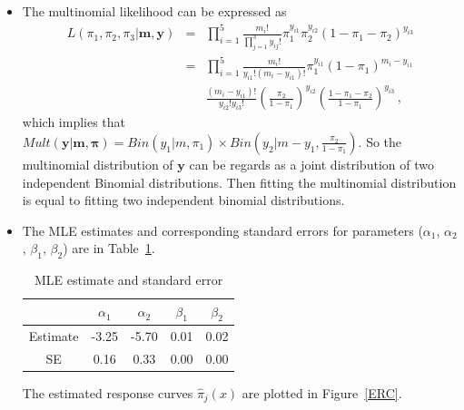 \documentclass[]{article}
\begin{document}
\begin{enumerate}
{		\item[Sol 1]
		\begin{itemize}
			\item[(a)]
			The multinomial likelihood can be expressed as 
			\begin{eqnarray}
			L(\pi_1,\pi_2,\pi_3| \bm m, \bm y)  & = &  \prod_{i = 1}^{5}\frac{m_i!}{\prod_{j = 1}^{3}y_{ij}!}\pi_1^{y_{i1}} \pi_2^{y_{i2}} (1-\pi_1-\pi_2)^{y_{i3}}\\
			& = & \prod_{i = 1}^{5} \frac{m_i!}{y_{i1}!(m_i - y_{i1})!}\pi_{1}^{y_{i1}}(1-\pi_{1})^{m_i - y_{i1}}\\
			& &\frac{(m_i-y_{i1})!}{y_{i2}! y_{i3}!}(\frac{\pi_{2}}{1-\pi_{1}})^{y_{i2}} (\frac{1-\pi_1-\pi_2}{1-\pi_1})^{y_{i3}}\,,
			\end{eqnarray}
			which implies that $Mult(\bm y| \bm m, \bm \pi) = Bin(y_1| m, \pi_1) \times Bin(y_2| m-y_1, \frac{\pi_2}{1-\pi_1})$. So the multinomial distribution of $\bm y$ can be regards as a joint distribution of two independent Binomial distributions. Then fitting the multinomial distribution is equal to fitting two independent binomial distributions.
			\item[(b)]
			The MLE estimates and corresponding standard errors for parameters ($\alpha_1$, $\alpha_2$, $\beta_1$, $\beta_2$) are in Table~\ref{MLE}.
			\begin{table}[ht!]
				\centering
				\caption{MLE estimate and standard error}
				\begin{tabular}{c|c|c|c|c}
					\hline
					                 &  $\alpha_1$  &  $\alpha_2$  &  $\beta_1$  &  $\beta_2$  \\
					\hline
					 Estimate  &  -3.25  &  -5.70  & 0.01   &   0.02 \\
					 \hline
					 SE           &   0.16   &   0.33    &  0.00  &   0.00 \\
					 \hline
				\end{tabular}
				\label{MLE}
			\end{table}
			The estimated response curves $\hat{\pi}_j(x)$ are plotted in Figure~\ref{ERC}.
			\begin{figure}[ht!]
				\centering

\end{figure}
\end{itemize}}
\end{enumerate}
\end{document}
